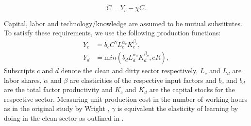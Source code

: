 \begin{equation}
	\dot{C} = Y_c - \chi C.
	\label{eq:learning_by_doing}
\end{equation}

Capital, labor and technology/knowledge are assumed to be mutual substitutes. To satisfy these requirements, we use the following production functions:
\begin{align}
	Y_c &= b_c C^{\gamma} L_c^{\alpha_c}K_c^{\beta_c}, \label{eq:clean_production} \\
	Y_d &= {\mathrm min}\left( b_d L_d^{\alpha_d}K_d^{\beta_d}, e R \right), \label{eq:dirty_production}
\end{align}
Subscripts $c$ and $d$ denote the clean and dirty sector respectively, $L_c$ and $L_d$ are labor shares, $\alpha$ and $\beta$ are elasticities of the respective input factors and $b_c$ and $b_d$ are the total factor productivity and $K_c$ and $K_d$ are the capital stocks for the respective sector. Measuring unit production cost in the number of working hours as in the original study by Wright \cite{wright1936factors}, $\gamma$ is equivalent the elasticity of learning by doing in the clean sector as outlined in \cite{Kahouli-Brahmi2008}.


